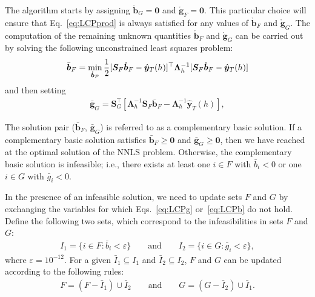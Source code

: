 \documentclass[twocolumn]{svjour3}
\begin{document}
The algorithm starts by assigning $\mathring{\bm{b}}_{G} = \bm{0}$ and $\mathring{\bm{g}}_{F} = \bm{0}$. This particular choice will ensure that Eq.~\eqref{eq:LCPprod} is always satisfied for any values of $\mathring{\bm{b}}_{F}$ and $\mathring{\bm{g}}_{G}$.
The computation of the remaining unknown quantities $\mathring{\bm{b}}_{F}$ and $\mathring{\bm{g}}_{G}$ can be carried out by solving the following unconstrained least squares problem:
{\color{red} 
\begin{align}
\label{eq:basicquad}
\bar{\bm{b}}_{F} = \operatornamewithlimits{min}_{\mathring{\bm{b}}_{F}} \frac{1}{2}[\bm{S}_{F}\mathring{\bm{b}}_{F} - \hat{\bm{y}}_{T}(h)]^\top\bm{\Lambda}_{h}^{-1} [\bm{S}_{F}\mathring{\bm{b}}_{F} - \hat{\bm{y}}_{T}(h)]
\end{align}
}
and then setting
\begin{align}
\label{eq:basicgrad}
\bar{\bm{g}}_{G} = \bm{S}_{G}^\top[\bm{\Lambda}_{h}^{-1}\bm{S}_{F}\bar{\bm{b}}_{F} - \bm{\Lambda}_{h}^{-1}\hat{\bm{y}}_{T}(h)],
\end{align}

The solution pair ($\bar{\bm{b}}_{F}$, $\bar{\bm{g}}_{G}$) is referred to as a complementary basic solution. If a complementary basic solution satisfies $\bar{\bm{b}}_{F} \geq \bm{0}$ and $\bar{\bm{g}}_{G} \geq \bm{0}$, then we have reached at the optimal solution of the NNLS problem. Otherwise, the complementary basic solution is infeasible; i.e., there exists at least one $i \in F$ with $\bar{b}_{i} < 0$ or one $i \in G$ with $\bar{g}_{i} < 0$.

In the presence of an infeasible solution, we need to update sets $F$ and $G$ by exchanging the variables for which Eqs.~\eqref{eq:LCPg} or~\eqref{eq:LCPb} do not hold. Define the following two sets, which correspond to the infeasibilities in sets $F$ and $G$:
\begin{align}
\label{eq:indexset}
I_{1} = \{i \in F: \bar{b}_{i} < \varepsilon\} \qquad \text{and} \qquad I_{2} = \{i \in G: \bar{g}_{i} < \varepsilon\},
\end{align}
where $\varepsilon = 10^{-12}$. For a given $\bar{I}_{1} \subseteq I_{1}$ and $\bar{I}_{2} \subseteq I_{2}$, $F$ and $G$ can be updated according to the following rules:
\begin{align}
\label{eq:indexsetrev}
F = (F - \bar{I}_{1}) \cup \bar{I}_{2} \qquad \text{and} \qquad G = (G - \bar{I}_{2}) \cup \bar{I}_{1}.
\end{align}
\end{document}
